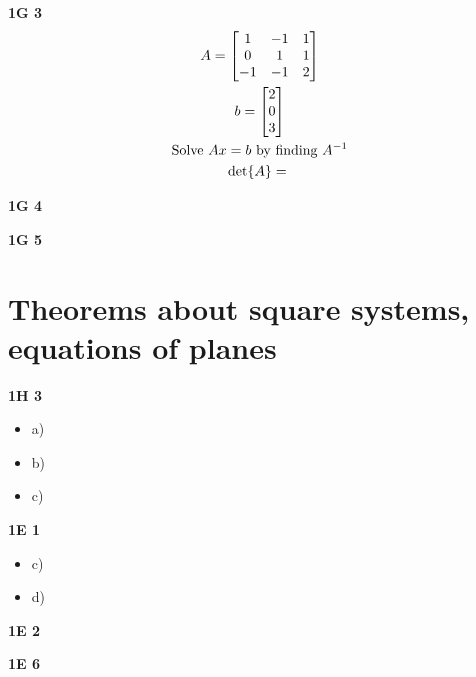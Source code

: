\documentclass[11pt]{article}
\begin{document}
    \begin{problem}
        \textbf{1G 3}\\
        \begin{gather*}
            A = \bmqty{1 & -1 & 1\\
            0 & 1 & 1 \\
            -1 & -1 & 2}\\
            b = \bmqty{ 2 \\ 0 \\ 3 }\\
            \text{Solve $Ax=b$ by finding $A^{-1}$}\\
            \det{A}=\
        \end{gather*}
    \end{problem}
    \begin{problem}
        \textbf{1G 4}
    \end{problem}
    \begin{problem}
        \textbf{1G 5}
    \end{problem}


    \section{Theorems about square systems, equations of planes}
    \begin{problem}
        \textbf{1H 3}
        \begin{itemize}
            \item a)
            \item b)
            \item c)
        \end{itemize}
    \end{problem}
    \begin{problem}
        \textbf{1E 1}
        \begin{itemize}
            \item c)
            \item d)
        \end{itemize}
    \end{problem}
    \begin{problem}
        \textbf{1E 2}
        \begin{problem}
            \textbf{1E 6}
        \end{problem}
    \end{problem}
\end{document}
